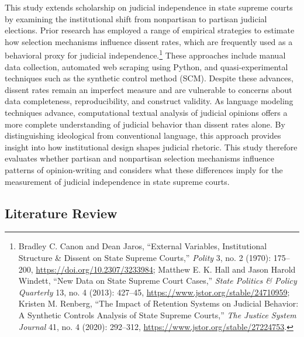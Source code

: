 This study extends scholarship on judicial independence in state supreme
courts by examining the institutional shift from nonpartisan to partisan
judicial elections. Prior research has employed a range of empirical
strategies to estimate how selection mechanisms influence dissent rates,
which are frequently used as a behavioral proxy for judicial
independence.\footnote{Bradley C. Canon and Dean Jaros, {``External
  {Variables}, {Institutional Structure} \& {Dissent} on {State Supreme
  Courts},''} \emph{Polity} 3, no. 2 (1970): 175--200,
  \url{https://doi.org/10.2307/3233984}; Matthew E. K. Hall and Jason
  Harold Windett, {``New {Data} on {State Supreme Court Cases},''}
  \emph{State Politics \& Policy Quarterly} 13, no. 4 (2013): 427--45,
  \url{https://www.jstor.org/stable/24710959}; Kristen M. Renberg,
  {``The {Impact} of {Retention Systems} on {Judicial Behavior}: A
  {Synthetic Controls Analysis} of {State Supreme Courts},''} \emph{The
  Justice System Journal} 41, no. 4 (2020): 292--312,
  \url{https://www.jstor.org/stable/27224753}.} These approaches include
manual data collection, automated web scraping using Python, and
quasi-experimental techniques such as the synthetic control method
(SCM). Despite these advances, dissent rates remain an imperfect measure
and are vulnerable to concerns about data completeness, reproducibility,
and construct validity. As language modeling techniques advance,
computational textual analysis of judicial opinions offers a more
complete understanding of judicial behavior than dissent rates alone. By
distinguishing ideological from conventional language, this approach
provides insight into how institutional design shapes judicial rhetoric.
This study therefore evaluates whether partisan and nonpartisan
selection mechanisms influence patterns of opinion-writing and considers
what these differences imply for the measurement of judicial
independence in state supreme courts.

\subsection{Literature Review}\label{literature-review}

